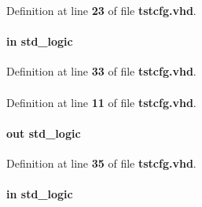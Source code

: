 Definition at line {\bf 23} of file {\bf tstcfg.\+vhd}.

\paragraph[{mreset}]{ {\bfseries \textcolor{keywordflow}{in}\textcolor{vhdlchar}{ }} {\bfseries \textcolor{comment}{std\+\_\+logic}\textcolor{vhdlchar}{ }} \hspace{0.3cm}{\ttfamily [Port]}}\label{clasststcfg_a3f01f53cfe06b99a7bfa97b24503f39b}


Definition at line {\bf 33} of file {\bf tstcfg.\+vhd}.

\paragraph[{numeric\+\_\+std}]{\hspace{0.3cm}{\ttfamily [Package]}}\label{clasststcfg_a2edc34402b573437d5f25fa90ba4013e}


Definition at line {\bf 11} of file {\bf tstcfg.\+vhd}.

\paragraph[{oen}]{ {\bfseries \textcolor{keywordflow}{out}\textcolor{vhdlchar}{ }} {\bfseries \textcolor{comment}{std\+\_\+logic}\textcolor{vhdlchar}{ }} \hspace{0.3cm}{\ttfamily [Port]}}\label{clasststcfg_a2b4865d9617410fdd3598db17e63bdbf}


Definition at line {\bf 35} of file {\bf tstcfg.\+vhd}.

\paragraph[{sclk}]{ {\bfseries \textcolor{keywordflow}{in}\textcolor{vhdlchar}{ }} {\bfseries \textcolor{comment}{std\+\_\+logic}\textcolor{vhdlchar}{ }} \hspace{0.3cm}{\ttfamily [Port]}}\label{clasststcfg_ac922a2fc6a86b71aca5c7d49ea3bc36b}


